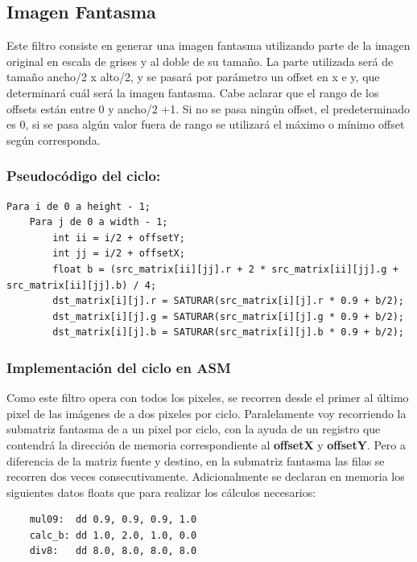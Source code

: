 \subsection{Imagen Fantasma}
Este filtro consiste en generar una imagen fantasma utilizando parte de la imagen original en escala de grises y al doble de su tamaño. La parte utilizada será de tamaño ancho/2 x alto/2, y se pasará por parámetro un offset en x e y, que determinará cuál será la imagen fantasma. Cabe aclarar que el rango de los offsets están entre 0 y ancho/2 +1. Si no se pasa ningún offset, el predeterminado es 0, si se pasa algún valor fuera de rango se utilizará el máximo o mínimo offset según corresponda.

\subsubsection{Pseudocódigo del ciclo:}
\begin{codesnippet}
\begin{verbatim}
Para i de 0 a height - 1;
    Para j de 0 a width - 1; 
        int ii = i/2 + offsetY;
        int jj = i/2 + offsetX;
        float b = (src_matrix[ii][jj].r + 2 * src_matrix[ii][jj].g + src_matrix[ii][jj].b) / 4;
        dst_matrix[i][j].r = SATURAR(src_matrix[i][j].r * 0.9 + b/2);
        dst_matrix[i][j].g = SATURAR(src_matrix[i][j].g * 0.9 + b/2);
        dst_matrix[i][j].b = SATURAR(src_matrix[i][j].b * 0.9 + b/2);
\end{verbatim}
\end{codesnippet}

\subsubsection{Implementación del ciclo en ASM}
Como este filtro opera con todos los pixeles, se recorren desde el primer al último pixel de las imágenes de a dos pixeles por ciclo. Paralelamente voy recorriendo la submatriz fantasma de a un pixel por ciclo, con la ayuda de un registro que contendrá la dirección de memoria correspondiente al \textbf{offsetX} y \textbf{offsetY}. 
Pero a diferencia de la matriz fuente y destino, en la submatriz fantasma las filas se recorren dos veces consecutivamente.
Adicionalmente se declaran en memoria los siguientes datos floats que para realizar los cálculos necesarios: 
\begin{codesnippet}
\begin{verbatim}   
    mul09:  dd 0.9, 0.9, 0.9, 1.0 
    calc_b: dd 1.0, 2.0, 1.0, 0.0 
    div8:   dd 8.0, 8.0, 8.0, 8.0 
\end{verbatim}
\end{codesnippet}

